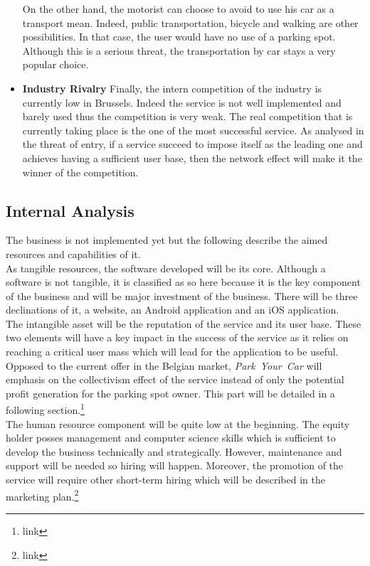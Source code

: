 \documentclass[12pt,a4paper,oneside]{book}
\newcommand{\bp}{\textit{Park~Your~Car }}
\begin{document}
\begin{itemize}
On the other hand, the motorist can choose to avoid to use his car as a transport mean. Indeed, public transportation, bicycle and walking are other possibilities. In that case, the user would have no use of a parking spot. Although this is a serious threat, the transportation by car stays a very popular choice.
\item \textbf{Industry Rivalry} Finally, the intern competition of the industry is currently low in Brussels. Indeed the service is not well implemented and barely used thus the competition is very weak. The real competition that is currently taking place is the one of the most successful service. As analysed in the threat of entry, if a service succeed to impose itself as the leading one and achieves  having a sufficient user base, then the network effect will make it the winner of the competition.
\end{itemize}

\subsection{Internal Analysis}
The business is not implemented yet but the following describe the aimed resources and capabilities of it.\\

As tangible resources, the software developed will be its core. Although a software is not tangible, it is classified as so here because it is the key component of the business and will be major investment of the business. There will be three declinations of it, a website, an Android application and an iOS application.\\

The intangible asset will be the reputation of the service and its user base. These two elements will have a key impact in the success of the service as it relies on reaching a critical user mass which will lead for the application to be useful. Opposed to the current offer in the Belgian market, \bp will emphasis on the collectivism effect of the service instead of only the potential profit generation for the parking spot owner. This part will be detailed in a following section.\footnote{link}\\

The human resource component will be quite low at the beginning. The equity holder posses management and computer science skills which is sufficient to develop the business technically and strategically. However, maintenance and support will be needed so hiring will happen. Moreover, the promotion of the service will require other short-term hiring which will be described in the marketing plan.\footnote{link}\\
\end{document}
